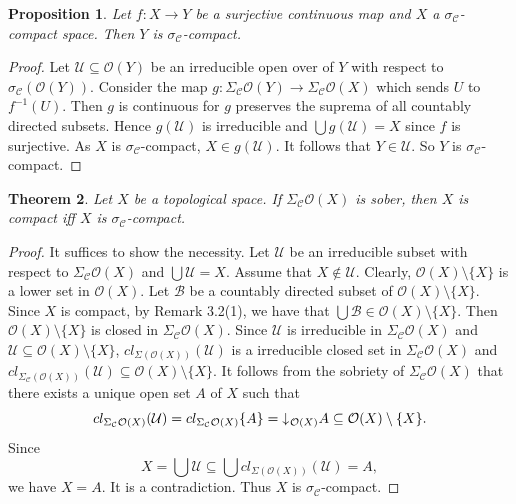 \documentclass[preprint,12pt]{elsarticle}
\numberwithin{equation}{section}
\newtheorem{theorem}{Theorem}[section]
\newtheorem{proposition}[theorem]{Proposition}
\newcommand{\dn}{\mathord{\downarrow}\hspace{0.05em}}
\begin{document}
\begin{proposition} Let $f:X\longrightarrow Y$ be a surjective continuous map and $X$ a $\sigma_{\mathcal{C}}$-compact space. Then $Y$ is $\sigma_{\mathcal{C}}$-compact.
\end{proposition}
\begin{proof}Let $\mathcal{U}\subseteq\mathcal{O}(Y)$ be an irreducible open over of $Y$ with respect to $\sigma_{\mathcal{C}}(\mathcal{O}(Y))$. Consider the map $g:\Sigma_{\mathcal{C}}\mathcal{O}(Y)\longrightarrow\Sigma_{\mathcal{C}}\mathcal{O}(X)$ which sends $U$ to $f^{-1}(U)$. Then $g$ is continuous for $g$ preserves the suprema of all countably directed subsets. Hence $g(\mathcal{U})$ is irreducible and $\bigcup g(\mathcal{U})=X$ since $f$ is surjective. As $X$ is $\sigma_{\mathcal{C}}$-compact, $X\in g(\mathcal{U})$. It follows that $Y\in\mathcal{U}$. So $Y$ is $\sigma_{\mathcal{C}}$-compact.
\end{proof}





\begin{theorem} Let $X$ be a topological space. If $\Sigma_{\mathcal{C}}\mathcal{O}(X)$ is sober, then $X$ is compact iff $X$ is $\sigma_{\mathcal{C}}$-compact.

\end{theorem}

\begin{proof}It suffices to show the necessity. Let $\mathcal{U}$  be an irreducible subset with respect to $\Sigma_{\mathcal{C}}\mathcal{O}(X)$ and $\bigcup\mathcal{U}=X$. Assume that $X\not \in \mathcal{U}$. Clearly, $\mathcal{O}(X)\setminus \{X\}$ is a lower set in $\mathcal{O}(X)$. Let $\mathcal{B}$ be a countably directed subset of $\mathcal{O}(X)\setminus\{X\}$. Since $X$ is compact, by Remark 3.2(1), we have that $\bigcup\mathcal{B}\in\mathcal{O}(X)\setminus \{X\}$. Then $\mathcal{O}(X)\setminus \{X\}$ is closed in $\Sigma_{\mathcal{C}}\mathcal{O}(X)$. Since $\mathcal{U}$ is irreducible in $\Sigma_{\mathcal{C}}\mathcal{O}(X)$ and $\mathcal{U}\subseteq \mathcal{O}(X)\setminus \{X\}$, $cl_{\Sigma(\mathcal{O}(X))}(\mathcal{U})$ is a irreducible closed set in $\Sigma_{\mathcal{C}}\mathcal{O}(X)$  and $cl_{\Sigma_{\mathcal{C}}(\mathcal{O}(X))}(\mathcal{U})\subseteq \mathcal{O}(X)\setminus \{X\}$. It follows from the sobriety of $\Sigma_{\mathcal{C}}\mathcal{O}(X)$ that there exists a unique open set $A$ of $X$ such that $$cl_{\Sigma_{\mathcal{C}}\mathcal{O}(X)}(\mathcal{U})=cl_{\Sigma_{\mathcal{C}}\mathcal{O}(X)}\{A\}=\dn_{\mathcal{O}(X)} A\subseteq\mathcal{O}(X)\setminus \{X\}.$$ Since $$X=\bigcup \mathcal{U}\subseteq\bigcup cl_{\Sigma(\mathcal{O}(X))}(\mathcal{U})=A,$$ we have $X=A$. It is a contradiction. Thus $X$ is $\sigma_{\mathcal{C}}$-compact.\end{proof}
\end{document}
